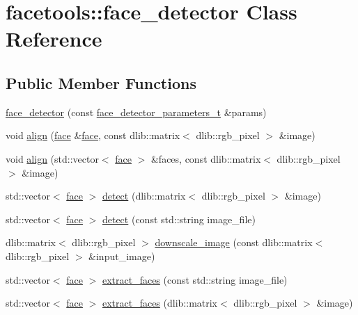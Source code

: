 \hypertarget{classfacetools_1_1face__detector}{}\section{facetools\+:\+:face\+\_\+detector Class Reference}
\label{classfacetools_1_1face__detector}
\subsection*{Public Member Functions}
\begin{DoxyCompactItemize}
\item 
\hyperlink{classfacetools_1_1face__detector_a7e449b6a578af11128db93acf749003a}{face\+\_\+detector} (const \hyperlink{structfacetools_1_1face__detector__parameters__t}{face\+\_\+detector\+\_\+parameters\+\_\+t} \&params)
\item 
void \hyperlink{classfacetools_1_1face__detector_a356f4bad11b7d26ef2179462c2bb6b1f}{align} (\hyperlink{structfacetools_1_1face}{face} \&\hyperlink{structfacetools_1_1face}{face}, const dlib\+::matrix$<$ dlib\+::rgb\+\_\+pixel $>$ \&image)
\item 
void \hyperlink{classfacetools_1_1face__detector_a9bf4ec967e8c585b772424a969f9b7f0}{align} (std\+::vector$<$ \hyperlink{structfacetools_1_1face}{face} $>$ \&faces, const dlib\+::matrix$<$ dlib\+::rgb\+\_\+pixel $>$ \&image)
\item 
std\+::vector$<$ \hyperlink{structfacetools_1_1face}{face} $>$ \hyperlink{classfacetools_1_1face__detector_a00ca01a375173299fb9169acae9509bf}{detect} (dlib\+::matrix$<$ dlib\+::rgb\+\_\+pixel $>$ \&image)
\item 
std\+::vector$<$ \hyperlink{structfacetools_1_1face}{face} $>$ \hyperlink{classfacetools_1_1face__detector_a5f502ba1a1c91cdd48e97aab4f1e7eee}{detect} (const std\+::string image\+\_\+file)
\item 
dlib\+::matrix$<$ dlib\+::rgb\+\_\+pixel $>$ \hyperlink{classfacetools_1_1face__detector_a5fb3e97d411b5a252e16ab3bea0cc121}{downscale\+\_\+image} (const dlib\+::matrix$<$ dlib\+::rgb\+\_\+pixel $>$ \&input\+\_\+image)
\item 
std\+::vector$<$ \hyperlink{structfacetools_1_1face}{face} $>$ \hyperlink{classfacetools_1_1face__detector_a596351576140fc3cf4fd2ce7238a074d}{extract\+\_\+faces} (const std\+::string image\+\_\+file)
\item 
std\+::vector$<$ \hyperlink{structfacetools_1_1face}{face} $>$ \hyperlink{classfacetools_1_1face__detector_ae06b627ad4af04dc4cdd64d7c8786303}{extract\+\_\+faces} (dlib\+::matrix$<$ dlib\+::rgb\+\_\+pixel $>$ \&image)
\end{DoxyCompactItemize}



